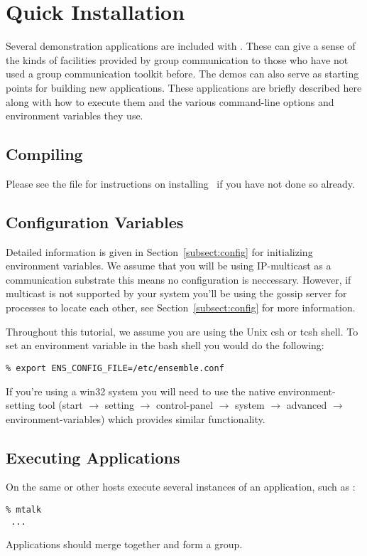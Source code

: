 %
%
%
\section{Quick Installation} 

Several demonstration applications are included with \ensemble.
These can give a sense of the kinds of facilities provided by group
communication to those who have not used a group communication
toolkit before.  The demos can also serve as starting points for
building new applications.  These applications are briefly described
here along with how to execute them and the various command-line
options and environment variables they use.

\subsection{Compiling}
Please see the file  for instructions on
installing \ensemble\ if you have not done so already.

\subsection{Configuration Variables}
Detailed information is given in Section~\ref{subsect:config} for
initializing environment variables. We assume that you will be using
IP-multicast as a communication substrate this means no configuration
is neccessary. However, if multicast is not supported by your system you'll
be using the gossip server for processes to locate each
other, see Section~\ref{subsect:config} for more information.

Throughout this tutorial, we assume you are using the Unix csh or
tcsh shell. To set an environment variable in the bash shell you would
do the following:
\begin{verbatim}
% export ENS_CONFIG_FILE=/etc/ensemble.conf
\end{verbatim}
If you're using a win32 system you will need to use the native
environment-setting tool
(start $\rightarrow$ setting $\rightarrow$ control-panel $\rightarrow$ system $\rightarrow$ advanced $\rightarrow$ environment-variables)
 which provides similar functionality. 

\subsection{Executing Applications}
On the same or other hosts execute several instances of an
application, such as :
\begin{verbatim}
% mtalk
 ...
\end{verbatim}

Applications should merge together and form a group.
